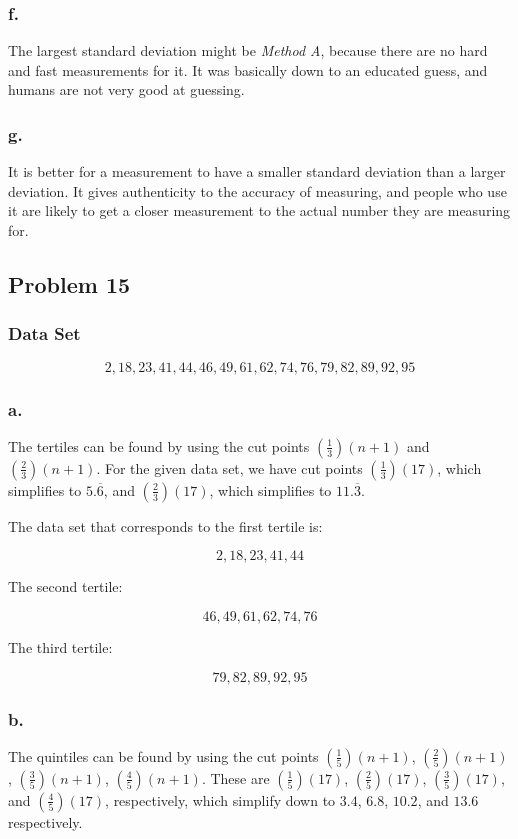 \documentclass[11pt]{article}
\begin{document}
\subsubsection*{f.}
The largest standard deviation might be \textit{Method A}, because there are no
hard and fast measurements for it. It was basically down to an educated guess,
and humans are not very good at guessing. 

\subsubsection*{g.}
It is better for a measurement to have a smaller standard deviation than a
larger deviation. It gives authenticity to the accuracy of measuring, and people
who use it are likely to get a closer measurement to the actual number they are
measuring for.

\subsection*{Problem 15}
\subsubsection*{Data Set}
\[2,18,23,41,44,46,49,61,62,74,76,79,82,89,92,95\]

\subsubsection*{a.}
The tertiles can be found by using the cut points $(\frac{1}{3})(n+1)$ and 
$(\frac{2}{3})(n+1)$. For the given data set, we have cut points $(\frac{1}{3})(17)$, which
simplifies to $5.\overline{6}$, and $(\frac{2}{3})(17)$, which simplifies to
$11.\overline{3}$. 

The data set that corresponds to the first tertile is:

\[2,18,23,41,44\]

The second tertile:

\[46,49,61,62,74,76\]

The third tertile:

\[79,82,89,92,95\]

\subsubsection*{b.}
The quintiles can be found by using the cut points $(\frac{1}{5})(n+1)$,
$(\frac{2}{5})(n+1)$,
$(\frac{3}{5})(n+1)$, $(\frac{4}{5})(n+1)$. These are  $(\frac{1}{5})(17)$,
$(\frac{2}{5})(17)$, $(\frac{3}{5})(17)$, and
$(\frac{4}{5})(17)$, respectively, which simplify down to $3.4$, $6.8$, $10.2$, and
$13.6$ respectively. 
\end{document}
